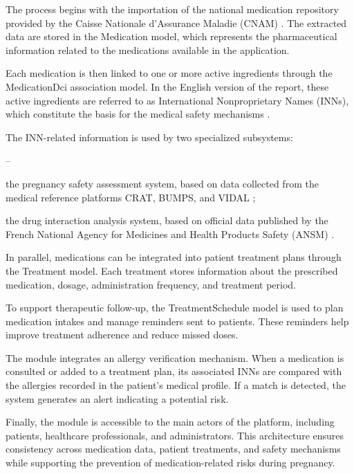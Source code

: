 The process begins with the importation of the national medication repository provided by the Caisse Nationale d'Assurance Maladie (CNAM) \cite{cnam}. The extracted data are stored in the Medication model, which represents the pharmaceutical information related to the medications available in the application.

Each medication is then linked to one or more active ingredients through the MedicationDci association model. In the English version of the report, these active ingredients are referred to as International Nonproprietary Names (INNs), which constitute the basis for the medical safety mechanisms \cite{who_inn}.

The INN-related information is used by two specialized subsystems:

\begin{list}{--}{}
 \setlength\itemsep{-0.5em}
  \item the pregnancy safety assessment system, based on data collected from the medical reference platforms CRAT, BUMPS, and VIDAL \cite{crat,bumps,vidal};

    \item the drug interaction analysis system, based on official data published by the French National Agency for Medicines and Health Products Safety (ANSM) \cite{ansm}.
\end{list}

In parallel, medications can be integrated into patient treatment plans through the Treatment model. Each treatment stores information about the prescribed medication, dosage, administration frequency, and treatment period.

To support therapeutic follow-up, the TreatmentSchedule model is used to plan medication intakes and manage reminders sent to patients. These reminders help improve treatment adherence and reduce missed doses.

The module integrates an allergy verification mechanism. When a medication is consulted or added to a treatment plan, its associated INNs are compared with the allergies recorded in the patient's medical profile. If a match is detected, the system generates an alert indicating a potential risk.

Finally, the module is accessible to the main actors of the platform, including patients, healthcare professionals, and administrators. This architecture ensures consistency across medication data, patient treatments, and safety mechanisms while supporting the prevention of medication-related risks during pregnancy.


